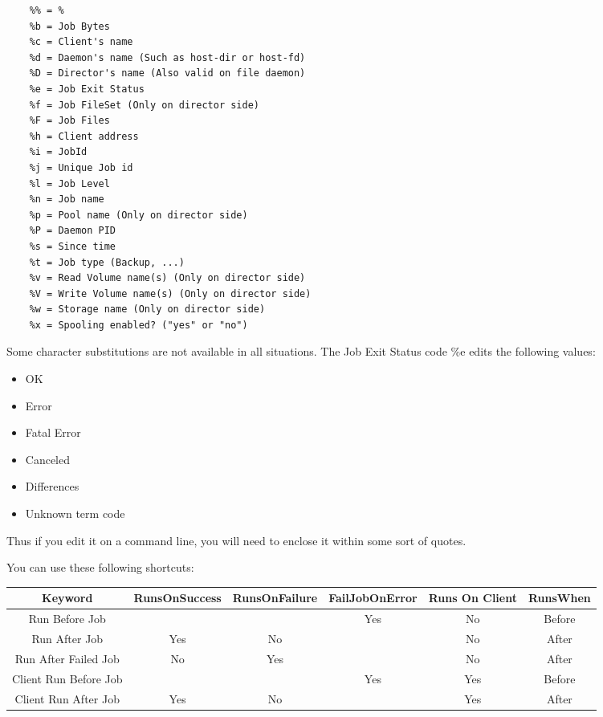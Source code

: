 \begin{description}
\label{character substitution}
\footnotesize
\begin{verbatim}
    %% = %
    %b = Job Bytes
    %c = Client's name
    %d = Daemon's name (Such as host-dir or host-fd)
    %D = Director's name (Also valid on file daemon)
    %e = Job Exit Status
    %f = Job FileSet (Only on director side)
    %F = Job Files
    %h = Client address
    %i = JobId
    %j = Unique Job id
    %l = Job Level
    %n = Job name
    %p = Pool name (Only on director side)
    %P = Daemon PID
    %s = Since time
    %t = Job type (Backup, ...)
    %v = Read Volume name(s) (Only on director side)
    %V = Write Volume name(s) (Only on director side)
    %w = Storage name (Only on director side)
    %x = Spooling enabled? ("yes" or "no")
\end{verbatim}
\normalsize

Some character substitutions are not available in all situations. The Job Exit
Status code \%e edits the following values:

\begin{itemize}
\item OK
\item Error
\item Fatal Error
\item Canceled
\item Differences
\item Unknown term code
\end{itemize}

   Thus if you edit it on a command line, you will need to enclose
   it within some sort of quotes.


You can use these following shortcuts:\\

\begin{tabular}{|c|c|c|c|c|c}
\hline
Keyword & RunsOnSuccess & RunsOnFailure  & FailJobOnError & Runs On Client & RunsWhen  \\
\hline
\hline
Run Before Job         &        &       & Yes     & No     & Before \\
\hline
Run After Job          &  Yes   &   No  &         & No     & After  \\
\hline
Run After Failed Job   &  No    &  Yes  &         & No     & After  \\
\hline
Client Run Before Job  &        &       & Yes     & Yes    & Before \\
\hline
Client Run After Job   &  Yes   &   No  &         & Yes    & After  \\
\hline
\end{tabular}


\end{description}
